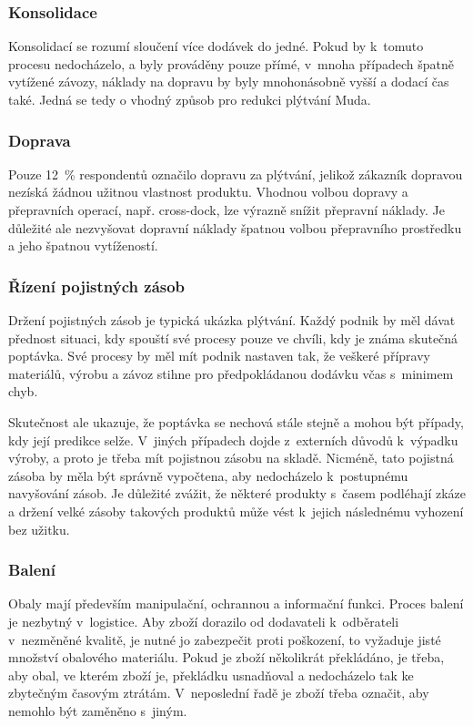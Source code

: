\subsubsection*{Konsolidace}

Konsolidací se rozumí sloučení více dodávek do jedné. Pokud by k~tomuto procesu nedocházelo, a byly prováděny pouze přímé, v~mnoha případech špatně vytížené závozy, náklady na dopravu by byly mnohonásobně vyšší a dodací čas také. Jedná se tedy o vhodný způsob pro redukci plýtvání Muda.


\subsubsection*{Doprava}

Pouze 12~\% respondentů označilo dopravu za plýtvání, jelikož zákazník dopravou nezíská žádnou užitnou vlastnost produktu. Vhodnou volbou dopravy a přepravních operací, např. cross-dock, lze výrazně snížit přepravní náklady. Je důležité ale nezvyšovat dopravní náklady špatnou volbou přepravního prostředku a jeho špatnou vytížeností.

\subsubsection*{Řízení pojistných zásob}

Držení pojistných zásob je typická ukázka plýtvání. Každý podnik by měl dávat přednost situaci, kdy spouští své procesy pouze ve chvíli, kdy je známa skutečná poptávka. Své procesy by měl mít podnik nastaven tak, že veškeré přípravy materiálů, výrobu a závoz stihne pro předpokládanou dodávku včas s~minimem chyb.

Skutečnost ale ukazuje, že poptávka se nechová stále stejně a mohou být případy, kdy její predikce selže. V~jiných případech dojde z~externích důvodů k~výpadku výroby, a proto je třeba mít pojistnou zásobu na skladě. Nicméně, tato pojistná zásoba by měla být správně vypočtena, aby nedocházelo k~postupnému navyšování zásob. Je důležité zvážit, že některé produkty s~časem podléhají zkáze a držení velké zásoby takových produktů může vést k~jejich následnému vyhození bez užitku.

\subsubsection*{Balení}

Obaly mají především manipulační, ochrannou a informační funkci. Proces balení je nezbytný v~logistice. Aby zboží dorazilo od dodavateli k~odběrateli v~nezměněné kvalitě, je nutné jo zabezpečit proti poškození, to vyžaduje jisté množství obalového materiálu. Pokud je zboží několikrát překládáno, je třeba, aby obal, ve kterém zboží je, překládku usnadňoval a nedocházelo tak ke zbytečným časovým ztrátám. V~neposlední řadě je zboží třeba označit, aby nemohlo být zaměněno s~jiným.

